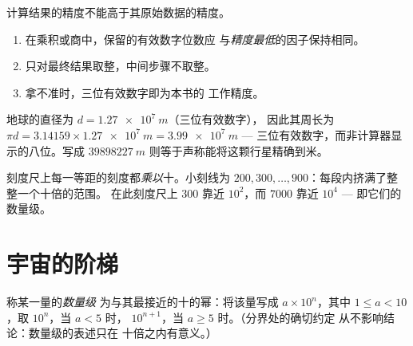 \begin{method}[保留几位数字]\label{met:g10:orders-of-magnitude:sigfig}
计算结果的精度不能高于其原始数据的精度。
\begin{enumerate}
  \item 在乘积或商中，保留的有效数字位数应
        与\emph{精度最低}的因子保持相同。
  \item 只对最终结果取整，中间步骤不取整。
  \item 拿不准时，三位有效数字即为本书的
        工作精度。
\end{enumerate}
\end{method}

\begin{example}[地球的周长]\label{ex:g10:orders-of-magnitude:sigfig}
地球的直径为 $d = \qty{1.27e7}{m}$（三位有效数字），
因此其周长为
$\pi d = \num{3.14159} \times \qty{1.27e7}{m} = \qty{3.99e7}{m}$ ---
三位有效数字，而非计算器显示的八位。写成
$\qty{39898227}{m}$ 则等于声称能将这颗行星精确到米。
\end{example}

\begin{omfigure}

{\small 刻度尺上每一等距的刻度都\emph{乘以}十。小刻线为
$200, 300, \dots, 900$：每段内挤满了整整一个十倍的范围。
在此刻度尺上 $\num{300}$ 靠近 $10^{2}$，而
$\num{7000}$ 靠近 $10^{4}$ --- 即它们的数量级。}
\end{omfigure}

\section{宇宙的阶梯}

\begin{definition}[数量级]\label{def:g10:orders-of-magnitude:oom}
称某一量的\emph{数量级}
为与其最接近的十的幂：将该量写成
 $a \times 10^{n}$，其中 $1 \leq a < 10$，取 $10^{n}$，当 $a < 5$ 时，
$10^{n+1}$，当 $a \geq 5$ 时。（分界处的确切约定
从不影响结论：数量级的表述只在
十倍之内有意义。）
\end{definition}

